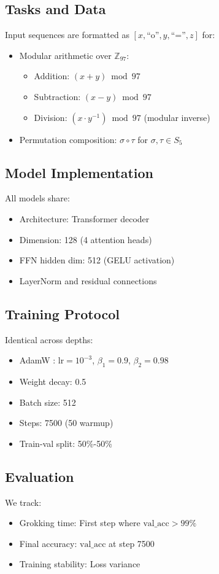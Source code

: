 \documentclass{article} %
\begin{document}
\subsection{Tasks and Data}
Input sequences are formatted as $[x, \text{``o''}, y, \text{``=''}, z]$ for:
\begin{itemize}
    \item Modular arithmetic over $\mathbb{Z}_{97}$:
    \begin{itemize}
        \item Addition: $(x + y) \bmod 97$
        \item Subtraction: $(x - y) \bmod 97$
        \item Division: $(x \cdot y^{-1}) \bmod 97$ (modular inverse)
    \end{itemize}
    \item Permutation composition: $\sigma \circ \tau$ for $\sigma,\tau \in S_5$
\end{itemize}

\subsection{Model Implementation}
All models share:
\begin{itemize}
    \item Architecture: Transformer decoder \citep{vaswani2017attention}
    \item Dimension: 128 (4 attention heads)
    \item FFN hidden dim: 512 (GELU activation)
    \item LayerNorm \citep{ba2016layer} and residual connections
\end{itemize}

\subsection{Training Protocol}
Identical across depths:
\begin{itemize}
    \item AdamW \citep{loshchilov2017adamw}: $\text{lr}=10^{-3}$, $\beta_1=0.9$, $\beta_2=0.98$
    \item Weight decay: 0.5
    \item Batch size: 512
    \item Steps: 7500 (50 warmup)
    \item Train-val split: 50\%-50\%
\end{itemize}

\subsection{Evaluation}
We track:
\begin{itemize}
    \item Grokking time: First step where $\text{val\_acc} > 99\%$
    \item Final accuracy: $\text{val\_acc}$ at step 7500
    \item Training stability: Loss variance
\end{itemize}
\end{document}
